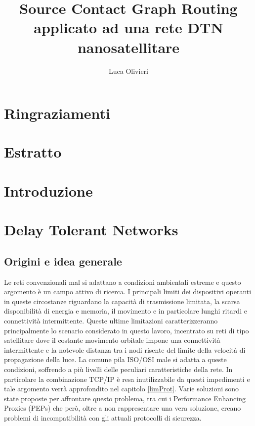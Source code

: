 \documentclass[12pt,a4paper,oneside]{book}
\author{Luca Olivieri}
\title{Source Contact Graph Routing applicato ad una rete DTN nanosatellitare}
\begin{document}
	
	
	
	\clearpage
	
	\chapter*{Ringraziamenti}	
	
	\clearpage
	
	\chapter*{Estratto}
	
	\clearpage
	
	\tableofcontents
	
	\clearpage
	
	\chapter{Introduzione}
	
	\clearpage
	
	\chapter{Delay Tolerant Networks}
		
		\section{Origini e idea generale}
		
		Le reti convenzionali mal si adattano a condizioni ambientali estreme e questo argomento è un campo attivo di ricerca. I principali limiti dei dispositivi operanti in queste circostanze riguardano la capacità di trasmissione limitata, la scarsa disponibilità di energia e memoria, il movimento e in particolare lunghi ritardi e connettività intermittente. Queste ultime limitazioni caratterizzeranno principalmente lo scenario considerato in questo lavoro, incentrato su reti di tipo satellitare dove il costante movimento orbitale impone una connettività intermittente e la notevole distanza tra i nodi risente del limite della velocità di propagazione della luce. La comune pila ISO/OSI male si adatta a queste condizioni, soffrendo a più livelli delle peculiari caratteristiche della rete. In particolare la combinazione TCP/IP è resa inutilizzabile da questi impedimenti e tale argomento verrà approfondito nel capitolo \ref{limProt}. Varie soluzioni sono state proposte per affrontare questo problema, tra cui i Performance Enhancing Proxies (PEPs) \cite{borderperformance} che però, oltre a non rappresentare una vera soluzione, creano problemi di incompatibilità con gli attuali protocolli di sicurezza.
		
\end{document}
